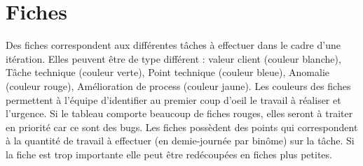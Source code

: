 \section{Fiches}\label{agile:fiches}
Des fiches correspondent aux différentes t\^aches à effectuer dans le cadre d'une itération. Elles peuvent \^etre de type différent : valeur client (couleur blanche), T\^ache technique (couleur verte), Point technique (couleur bleue), Anomalie (couleur rouge), Amélioration de process (couleur jaune). Les couleurs des fiches permettent à l'équipe d'identifier au premier coup d'oeil le travail à réaliser et l'urgence. Si le tableau comporte beaucoup de fiches rouges, elles seront à traiter en priorité car ce sont des bugs. Les fiches possèdent des points qui correspondent à la quantité de travail à effectuer (en demie-journée par bin\^ome) sur la t\^ache. Si la fiche est trop importante elle peut être redécoupées en fiches plus petites.

%
%

